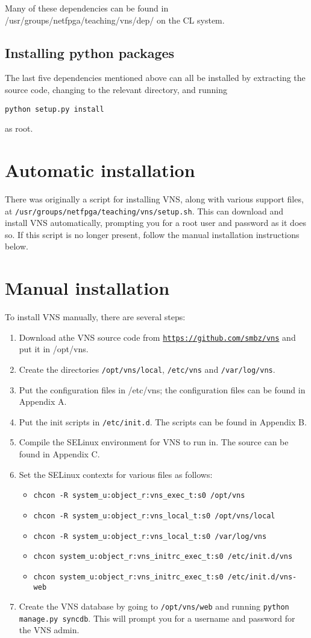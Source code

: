 \documentclass[a4paper,12pt]{report}
\begin{document}
Many of these dependencies can be found in /usr/groups/netfpga/teaching/vns/dep/ on the CL system.

\subsection{Installing python packages}
The last five dependencies mentioned above can all be installed by extracting the source code, changing to the relevant directory, and running

\texttt{python setup.py install}

as root.


\section{Automatic installation}
There was originally a script for installing VNS, along with various support files, at \texttt{/usr/groups/netfpga/teaching/vns/setup.sh}.  This can download and install VNS automatically, prompting you for a root user and password as it does so.  If this script is no longer present, follow the manual installation instructions below.


\section{Manual installation}
To install VNS manually, there are several steps:

\begin{enumerate}
\item Download athe VNS source code from \texttt{\url{https://github.com/smbz/vns}} and put it in /opt/vns.
\item Create the directories \texttt{/opt/vns/local}, \texttt{/etc/vns} and \texttt{/var/log/vns}.
\item Put the configuration files in /etc/vns; the configuration files can be found in Appendix A.
\item Put the init scripts in \texttt{/etc/init.d}.  The scripts can be found in Appendix B.
\item Compile the SELinux environment for VNS to run in.  The source can be found in Appendix C.
\item Set the SELinux contexts for various files as follows:
\begin{itemize}
\item \texttt{chcon -R system\_u:object\_r:vns\_exec\_t:s0 /opt/vns}
\item \texttt{chcon -R system\_u:object\_r:vns\_local\_t:s0 /opt/vns/local}
\item \texttt{chcon -R system\_u:object\_r:vns\_local\_t:s0 /var/log/vns}
\item \texttt{chcon system\_u:object\_r:vns\_initrc\_exec\_t:s0 /etc/init.d/vns}
\item \texttt{chcon system\_u:object\_r:vns\_initrc\_exec\_t:s0 /etc/init.d/vns-web}
\end{itemize}
\item Create the VNS database by going to \texttt{/opt/vns/web} and running \texttt{python manage.py syncdb}.  This will prompt you for a username and password for the VNS admin.
\end{enumerate}
\end{document}

